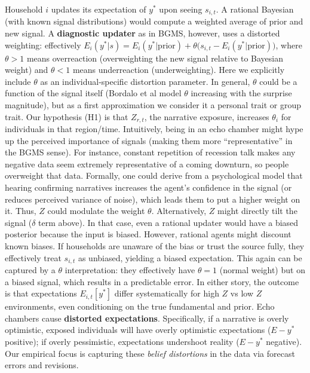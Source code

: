 \documentclass[12pt]{article}
\begin{document}
Household $i$ updates its expectation of $y^*$ upon seeing $s_{i,t}$. A rational Bayesian (with known signal distributions) would compute a weighted average of prior and new signal. A \textbf{diagnostic updater} as in BGMS, however, uses a distorted weighting: effectively $E_{i}(y^*|s) = E_{i}(y^*|\text{prior}) + \theta \big( s_{i,t} - E_{i}(y^*|\text{prior}) \big)$, where $\theta > 1$ means overreaction (overweighting the new signal relative to Bayesian weight) and $\theta < 1$ means underreaction (underweighting). Here we explicitly include $\theta$ as an individual-specific distortion parameter. In general, $\theta$ could be a function of the signal itself (Bordalo et al model $\theta$ increasing with the surprise magnitude), but as a first approximation we consider it a personal trait or group trait.
Our hypothesis (H1) is that $Z_{r,t}$, the narrative exposure, increases $\theta_{i}$ for individuals in that region/time. Intuitively, being in an echo chamber might hype up the perceived importance of signals (making them more ``representative'' in the BGMS sense). For instance, constant repetition of recession talk makes any negative data seem extremely representative of a coming downturn, so people overweight that data. Formally, one could derive from a psychological model that hearing confirming narratives increases the agent's confidence in the signal (or reduces perceived variance of noise), which leads them to put a higher weight on it. Thus, $Z$ could modulate the weight $\theta$.
Alternatively, $Z$ might directly tilt the signal ($\delta$ term above). In that case, even a rational updater would have a biased posterior because the input is biased. However, rational agents might discount known biases. If households are unaware of the bias or trust the source fully, they effectively treat $s_{i,t}$ as unbiased, yielding a biased expectation. This again can be captured by a $\theta$ interpretation: they effectively have $\theta=1$ (normal weight) but on a biased signal, which results in a predictable error.
In either story, the outcome is that expectations $E_{i,t}[y^*]$ differ systematically for high $Z$ vs low $Z$ environments, even conditioning on the true fundamental and prior. Echo chambers cause \textbf{distorted expectations}. Specifically, if a narrative is overly optimistic, exposed individuals will have overly optimistic expectations ($E - y^*$ positive); if overly pessimistic, expectations undershoot reality ($E - y^*$ negative). Our empirical focus is capturing these \textit{belief distortions} in the data via forecast errors and revisions.
\end{document}
